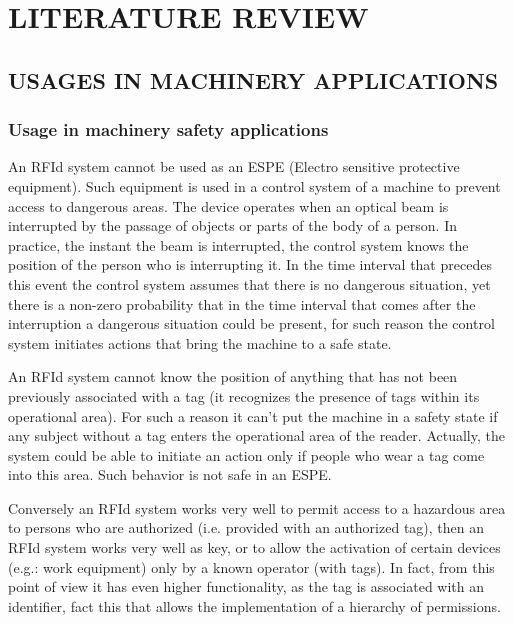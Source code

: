 
\chapter[LITERATURE REVIEW]{\fontsize{16}{12}\selectfont LITERATURE REVIEW}

\section[USAGES IN MACHINERY APPLICATIONS]{\fontsize{14}{12}\selectfont USAGES IN MACHINERY APPLICATIONS}

\subsection[Usage in machinery safety applications]{Usage in machinery safety applications}

An RFId system cannot be used as an ESPE (Electro sensitive protective equipment). Such equipment is used in a control system of a machine to prevent access to dangerous areas. The device operates when an optical beam is interrupted by the passage of objects or parts of the body of a person. In practice, the instant the beam is interrupted, the control system knows the position of the person who is interrupting it. In the time interval that precedes this event the control system assumes that there is no dangerous situation, yet there is a non-zero probability that in the time interval that comes after the interruption a dangerous situation could be present, for such reason the control system initiates actions that bring the machine to a safe state. 

\vspace*{1pc}
An RFId system cannot know the position of anything that has not been previously associated with a tag (it recognizes the presence of tags within its operational area). For such a reason it can’t put the machine in a safety state if any subject without a tag enters the operational area of the reader. Actually, the system could be able to initiate an action only if people who wear a tag come into this area. Such behavior is not safe in an ESPE.  

\vspace*{1pc}
Conversely an RFId system works very well to permit access to a hazardous area to persons who are authorized (i.e. provided with an authorized tag), then an RFId system works very well as key, or to allow the activation of certain devices (e.g.: work equipment) only by a known operator (with tags). In fact, from this point of view it has even higher functionality, as the tag is associated with an identifier, fact this that allows the implementation of a hierarchy of permissions.

